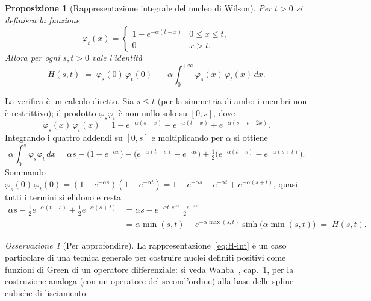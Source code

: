 \documentclass[11pt,a4paper]{article}
\theoremstyle{plain}
\newtheorem{proposizione}[teorema]{Proposizione}
\theoremstyle{definition}
\theoremstyle{remark}
\newtheorem*{osservazione}{Osservazione}
\begin{document}
\begin{proposizione}[Rappresentazione integrale del nucleo di Wilson]
\label{prop:H-int}
Per $t>0$ si definisca la funzione
\[
  \varphi_t(x) =
  \begin{cases}
    1-e^{-\alpha(t-x)} & 0\le x\le t,\\[2pt]
    0 & x>t .
  \end{cases}
\]
Allora per ogni $s,t>0$ vale l'identit\`a
\begin{equation}
  H(s,t) \;=\; \varphi_s(0)\,\varphi_t(0)
  \;+\; \alpha\!\int_0^{+\infty}\!\varphi_s(x)\,\varphi_t(x)\,dx .
  \label{eq:H-int}
\end{equation}
\end{proposizione}

La verifica \`e un calcolo diretto. Sia $s\le t$ (per la simmetria di ambo i membri non \`e
restrittivo); il prodotto $\varphi_s\varphi_t$ \`e non nullo solo su $[0,s]$, dove
\[
  \varphi_s(x)\,\varphi_t(x)
  = 1 - e^{-\alpha(s-x)} - e^{-\alpha(t-x)} + e^{-\alpha(s+t-2x)} .
\]
Integrando i quattro addendi su $[0,s]$ e moltiplicando per $\alpha$ si ottiene
\[
  \alpha\!\int_0^{s}\!\varphi_s\varphi_t\,dx
  = \alpha s - \bigl(1-e^{-\alpha s}\bigr) - \bigl(e^{-\alpha(t-s)}-e^{-\alpha t}\bigr)
    + \tfrac12\bigl(e^{-\alpha(t-s)}-e^{-\alpha(s+t)}\bigr) .
\]
Sommando $\varphi_s(0)\,\varphi_t(0) = (1-e^{-\alpha s})(1-e^{-\alpha t})
= 1 - e^{-\alpha s} - e^{-\alpha t} + e^{-\alpha(s+t)}$, quasi tutti i termini si elidono e resta
\begin{align*}
  \alpha s - \tfrac12 e^{-\alpha(t-s)} + \tfrac12 e^{-\alpha(s+t)}
  &= \alpha s - e^{-\alpha t}\,\frac{e^{\alpha s}-e^{-\alpha s}}{2}\\
  &= \alpha\min(s,t) - e^{-\alpha\max(s,t)}\sinh\!\bigl(\alpha\min(s,t)\bigr)
  \;=\; H(s,t) .
\end{align*}

\begin{osservazione}[Per approfondire]
La rappresentazione~\eqref{eq:H-int} \`e un caso particolare di una tecnica generale per
costruire nuclei definiti positivi come funzioni di Green di un operatore differenziale: si
veda Wahba~\cite{wahba1990}, cap.~1, per la costruzione analoga (con un operatore del
second'ordine) alla base delle spline cubiche di lisciamento.
\end{osservazione}
\end{document}

